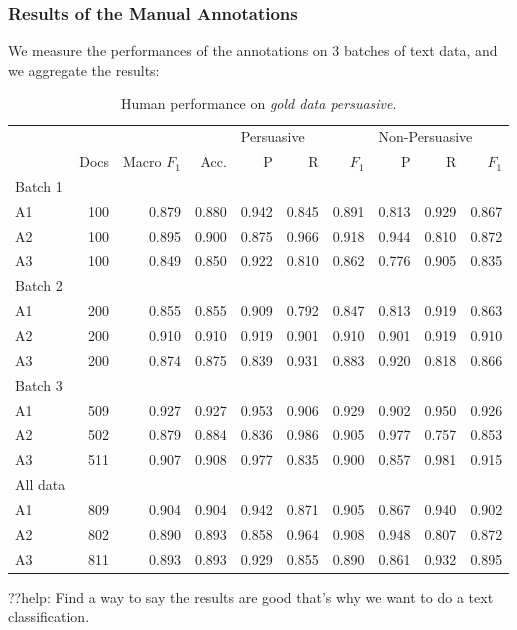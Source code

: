 \subsubsection{Results of the Manual Annotations}
We measure the performances of the annotations on 3 batches of text data, and we aggregate the results:
\begin{table}[H]
\begin{tabular}{lrrr|rrr|rrr}
	&	&	&	& \multicolumn{3}{l}{Persuasive} & \multicolumn{3}{l}{Non-Persuasive} \\
	& Docs	& Macro $F_1$ & Acc. & P & R	& $F_1$ & P & R & $F_1$ \\ \hline
Batch 1	&	&	&	&	&	&	&	&	&\\
A1	&100	&0.879	&0.880	&0.942	&0.845	&0.891	&0.813	&0.929	&0.867\\
A2	&100	&0.895	&0.900	&0.875	&0.966	&0.918	&0.944	&0.810	&0.872\\
A3	&100	&0.849	&0.850	&0.922	&0.810	&0.862	&0.776	&0.905	&0.835\\ \hline
Batch 2	&	&	&	&	&	&	&	&	&\\
A1	&200	&0.855	&0.855	&0.909	&0.792	&0.847	&0.813	&0.919	&0.863\\
A2	&200	&0.910	&0.910	&0.919	&0.901	&0.910	&0.901	&0.919	&0.910\\
A3	&200	&0.874	&0.875	&0.839	&0.931	&0.883	&0.920	&0.818	&0.866\\ \hline
Batch 3	&	&	&	&	&	&	&	&	&\\
A1	&509	&0.927	&0.927	&0.953	&0.906	&0.929	&0.902	&0.950	&0.926\\
A2	&502	&0.879	&0.884	&0.836	&0.986	&0.905	&0.977	&0.757	&0.853\\
A3	&511	&0.907	&0.908	&0.977	&0.835	&0.900	&0.857	&0.981	&0.915\\ \hline
All data	&	&	&	&	&	&	&	&	&\\
A1	&809	&0.904	&0.904	&0.942	&0.871	&0.905	&0.867	&0.940	&0.902\\
A2	&802	&0.890	&0.893	&0.858	&0.964	&0.908	&0.948	&0.807	&0.872\\
A3	&811	&0.893	&0.893	&0.929	&0.855	&0.890	&0.861	&0.932	&0.895\\
\end{tabular}
\caption{\label{tab:human-performance-annotation-study-1} Human performance on \emph{gold data persuasive}.}
\end{table}
??help: Find a way to say the results are good that's why we want to do a text classification.

